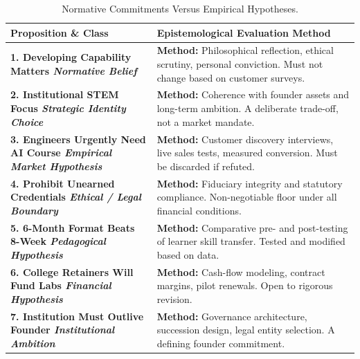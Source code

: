 \begin{table}[htbp]
\centering
\begin{tcolorbox}[
  enhanced,
  colback=white,
  colframe=BayesBorder!80!white,
  boxrule=0.4pt,
  arc=2pt,
  left=3pt,right=3pt,top=3pt,bottom=3pt,
  before skip=3pt,after skip=4pt
]
\scriptsize
\setlength{\tabcolsep}{3pt}
\renewcommand{\arraystretch}{1.18}
\begin{tabularx}{\linewidth}{@{} >{\bfseries\color{BayesInk}}p{2.3cm} >{\color{BayesInk}}X @{}}
\toprule
\textbf{Proposition \& Class} & \textbf{Epistemological Evaluation Method} \\
\midrule
1. Developing Capability Matters\newline
\textit{Normative Belief} & 
\textbf{Method:} Philosophical reflection, ethical scrutiny, personal conviction. Must not change based on customer surveys. \\
\midrule
2. Institutional STEM Focus\newline
\textit{Strategic Identity Choice} & 
\textbf{Method:} Coherence with founder assets and long-term ambition. A deliberate trade-off, not a market mandate. \\
\midrule
3. Engineers Urgently Need AI Course\newline
\textit{Empirical Market Hypothesis} & 
\textbf{Method:} Customer discovery interviews, live sales tests, measured conversion. Must be discarded if refuted. \\
\midrule
4. Prohibit Unearned Credentials\newline
\textit{Ethical / Legal Boundary} & 
\textbf{Method:} Fiduciary integrity and statutory compliance. Non-negotiable floor under all financial conditions. \\
\midrule
5. 6-Month Format Beats 8-Week\newline
\textit{Pedagogical Hypothesis} & 
\textbf{Method:} Comparative pre- and post-testing of learner skill transfer. Tested and modified based on data. \\
\midrule
6. College Retainers Will Fund Labs\newline
\textit{Financial Hypothesis} & 
\textbf{Method:} Cash-flow modeling, contract margins, pilot renewals. Open to rigorous revision. \\
\midrule
7. Institution Must Outlive Founder\newline
\textit{Institutional Ambition} & 
\textbf{Method:} Governance architecture, succession design, legal entity selection. A defining founder commitment. \\
\bottomrule
\end{tabularx}
\end{tcolorbox}
\caption{Normative Commitments Versus Empirical Hypotheses.}
\label{tab:normative-vs-empirical}
\end{table}

